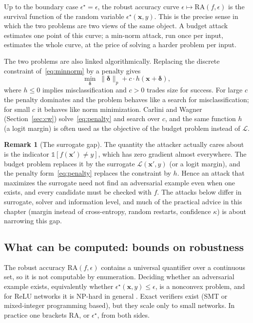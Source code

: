\documentclass[10pt,a4paper]{extarticle}
\theoremstyle{definition}
\newtheorem{remark}{Remark}[section]
\newcommand{\Loss}{\mathcal{L}}
\newcommand{\x}{\mathbf{x}}
\newcommand{\xadv}{\mathbf{x}'}
\newcommand{\bdelta}{\boldsymbol{\delta}}
\begin{document}
Up to the boundary case \(\epsilon^\star=\epsilon\), the robust accuracy curve \(\epsilon\mapsto\mathrm{RA}(f,\epsilon)\) is the survival function of the random variable \(\epsilon^\star(\x,y)\). This is the precise sense in which the two problems are two views of the same object. A budget attack estimates one point of this curve; a min-norm attack, run once per input, estimates the whole curve, at the price of solving a harder problem per input.

The two problems are also linked algorithmically. Replacing the discrete constraint of~\eqref{eq:minnorm} by a penalty gives
\begin{equation}\label{eq:penalty}
\min_{\bdelta}\;\|\bdelta\|_p+c\cdot h(\x+\bdelta),
\end{equation}
where \(h\le0\) implies misclassification and \(c>0\) trades size for success. For large \(c\) the penalty dominates and the problem behaves like a search for misclassification; for small \(c\) it behaves like norm minimization. Carlini and Wagner (Section~\ref{sec:cw}) solve~\eqref{eq:penalty} and search over \(c\), and the same function \(h\) (a logit margin) is often used as the objective of the budget problem instead of \(\Loss\).

\begin{remark}[The surrogate gap]\label{rem:surrogate}
The quantity the attacker actually cares about is the indicator \(\mathbb{1}[f(\xadv)\neq y]\), which has zero gradient almost everywhere. The budget problem replaces it by the surrogate \(\Loss(\xadv,y)\) (or a logit margin), and the penalty form~\eqref{eq:penalty} replaces the constraint by \(h\). Hence an attack that maximizes the surrogate need not find an adversarial example even when one exists, and every candidate must be checked with \(f\). The attacks below differ in surrogate, solver and information level, and much of the practical advice in this chapter (margin instead of cross-entropy, random restarts, confidence \(\kappa\)) is about narrowing this gap.
\end{remark}

\subsection{What can be computed: bounds on robustness}\label{sec:bounds}

The robust accuracy \(\mathrm{RA}(f,\epsilon)\) contains a universal quantifier over a continuous set, so it is not computable by enumeration. Deciding whether an adversarial example exists, equivalently whether \(\epsilon^\star(\x,y)\le\epsilon\), is a nonconvex problem, and for ReLU networks it is NP-hard in general \citep{katz2017reluplex}. Exact verifiers exist (SMT or mixed-integer programming based), but they scale only to small networks. In practice one brackets \(\mathrm{RA}\), or \(\epsilon^\star\), from both sides.
\end{document}
